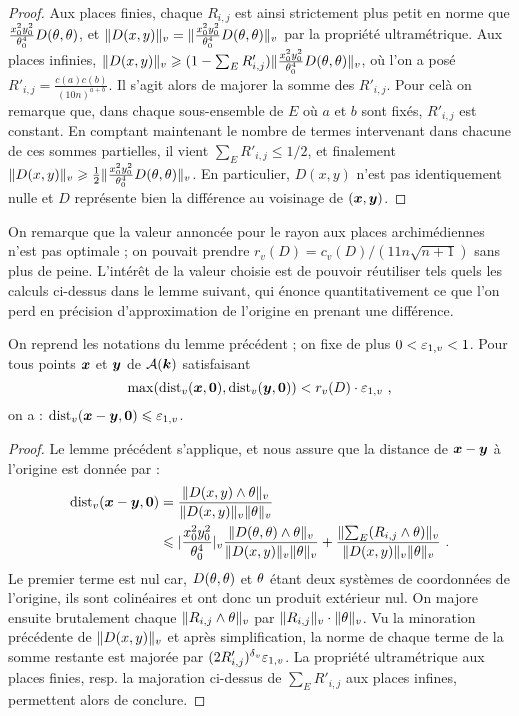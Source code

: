 \documentclass{mpg-preth}
\begin{document}
\begin{proof}
  Aux places finies, chaque $R_{i, j}$ est ainsi strictement plus petit en
  norme que $\frac{x_0^2y_0^2}{\theta_0^4}D(\theta, \theta)$, et $\lVert D(x, y)\rVert_{v} =
  \lVert\frac{x_0^2y_0^2}{\theta_0^4}D(\theta, \theta)\rVert_{v}$ par la propriété
  ultramétrique.  Aux places infinies, $\lVert D(x, y)\rVert_{v} \geqslant (1-\sum_E R'_{i, j})
  \lVert\frac{x_0^2y_0^2}{\theta_0^4}D(\theta, \theta)\rVert_{v}$, où l'on a posé $R'_{i, j} =
  \frac{c(a)c(b)}{ \left( 10n \right)^{a+b}}$. Il s'agit alors de majorer la
  somme des $R'_{i, j}$. Pour celà on remarque que, dans chaque sous-ensemble
  de $E$ où $a$ et $b$ sont fixés, $R'_{i, j}$ est constant. En comptant
  maintenant le nombre de termes intervenant dans chacune de ces sommes
  partielles, il vient $\sum_E R'_{i, j} \le 1/2$, et finalement $\lVert D(x, y)\rVert_{v}
  \geqslant \frac{1}{2} \lVert\frac{x_0^2y_0^2}{\theta_0^4}D(\theta, \theta)\rVert_{v}$. En
  particulier, $D(x, y)$ n'est pas identiquement nulle et $D$ représente bien
  la différence au voisinage de $({\boldsymbol{x}}, {\boldsymbol{y}})$.
\end{proof}

On remarque que la valeur annoncée pour le rayon aux places archimédiennes
n'est pas optimale ; on pouvait prendre $r_v(D) = c_v(D)/(11n\sqrt{n+1})$ sans
plus de peine. L'intérêt de la valeur choisie est de pouvoir réutiliser tels
quels les calculs ci-dessus dans le lemme suivant, qui énonce quantitativement
ce que l'on perd en précision d'approximation de l'origine en prenant une
différence.

\begin{lem} \label{DistRel}
  On reprend les notations du lemme précédent ; on fixe de plus $0 < \varepsilon_{1,
  v} < 1$. Pour tous points ${\boldsymbol{x}}$ et ${\boldsymbol{y}}$ de $\mathcal{A}(\boldsymbol{k})$ satisfaisant
  \[
  \max ( \mathrm{dist}_v({\boldsymbol{x}}, {\boldsymbol{0}}), \mathrm{dist}_v({\boldsymbol{y}}, {\boldsymbol{0}}) ) < r_v(D) \cdot \varepsilon_{1,v} \text{ ,}
  \]
  on a : $\mathrm{dist}_v({\boldsymbol{x}}-{\boldsymbol{y}}, {\boldsymbol{0}}) \leqslant \varepsilon_{1,v}$.
\end{lem}


\begin{proof}
  Le lemme précédent s'applique, et nous assure que la distance de
  ${\boldsymbol{x}}-{\boldsymbol{y}}$ à l'origine  est donnée par :
  \begin{align*}
  \mathrm{dist}_v({\boldsymbol{x}}-{\boldsymbol{y}}, {\boldsymbol{0}}) & = \frac{\lVert D(x, y) \wedge \theta\rVert_{v}}{\lVert D(x,
    y)\rVert_{v}\lVert\theta\rVert_{v}} \\
  & \leqslant \lvert\frac{x_0^2y_0^2}{\theta_0^4}\rvert_{v}\frac{\lVert D(\theta, \theta)\wedge
    \theta\rVert_{v}}{\lVert D(x, y)\rVert_{v}\lVert\theta\rVert_{v}} + \frac{\lVert\sum_E (R_{i, j} \wedge
    \theta)\rVert_{v}}{\lVert D(x, y)\rVert_{v}\lVert\theta\rVert_{v}} \text{ .}
  \end{align*}
  Le premier terme est nul car, $D(\theta, \theta)$ et $\theta$ étant deux systèmes
  de coordonnées de l'origine, ils sont colinéaires et ont donc un produit
  extérieur nul. On majore ensuite brutalement chaque $\lVert R_{i, j} \wedge
    \theta\rVert_{v}$ par $\lVert R_{i, j}\rVert_{v} \cdot \lVert\theta\rVert_{v}$. Vu la minoration précédente de
  $\lVert D(x, y)\rVert_{v}$ et après simplification, la norme de chaque terme de la somme
  restante est majorée par $(2R'_{i, j})^{\delta\smash{_v}} \varepsilon_{1, v}$. La propriété
  ultramétrique aux places finies, resp. la majoration ci-dessus de $\sum_E
  R'_{i, j}$ aux places infines, permettent alors de conclure.
\end{proof}
\end{document}

